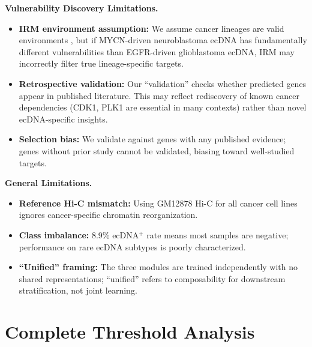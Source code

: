 \documentclass{article}
\begin{document}
\textbf{Vulnerability Discovery Limitations.}
\begin{itemize}[leftmargin=*, itemsep=2pt]
    \item \textbf{IRM environment assumption:} We assume cancer lineages are valid environments \citep{rosenfeld_2021_irm_risks}, but if MYCN-driven neuroblastoma ecDNA has fundamentally different vulnerabilities than EGFR-driven glioblastoma ecDNA, IRM may incorrectly filter true lineage-specific targets.
    \item \textbf{Retrospective validation:} Our ``validation'' checks whether predicted genes appear in published literature. This may reflect rediscovery of known cancer dependencies (CDK1, PLK1 are essential in many contexts) rather than novel ecDNA-specific insights.
    \item \textbf{Selection bias:} We validate against genes with any published evidence; genes without prior study cannot be validated, biasing toward well-studied targets.
\end{itemize}

\textbf{General Limitations.}
\begin{itemize}[leftmargin=*, itemsep=2pt]
    \item \textbf{Reference Hi-C mismatch:} Using GM12878 Hi-C for all cancer cell lines ignores cancer-specific chromatin reorganization.
    \item \textbf{Class imbalance:} 8.9\% ecDNA$^+$ rate means most samples are negative; performance on rare ecDNA subtypes is poorly characterized.
    \item \textbf{``Unified'' framing:} The three modules are trained independently with no shared representations; ``unified'' refers to composability for downstream stratification, not joint learning.
\end{itemize}


\section{Complete Threshold Analysis}
\label{app:threshold}
\end{document}
